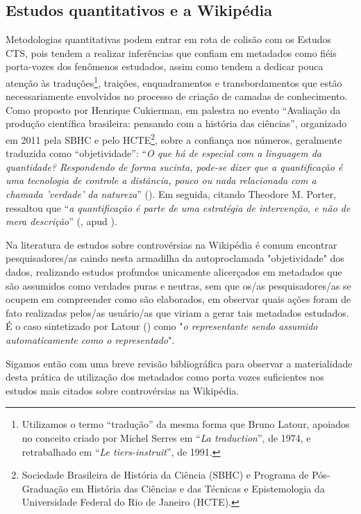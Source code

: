 
\subsection{Estudos quantitativos e a Wikipédia}

Metodologias quantitativas podem entrar em rota de colisão com os Estudos CTS, pois tendem a realizar inferências que confiam em metadados como fiéis porta-vozes dos fenômenos estudados, assim como tendem a dedicar pouca atenção às traduções\footnote{Utilizamos o termo ``tradução'' da mesma forma que  Bruno Latour, apoiados no conceito criado por Michel Serres em ``\textit{La traduction}'', de 1974, e retrabalhado em ``\textit{Le tiers-instruit}'', de 1991.}, traições, enquadramentos e transbordamentos que estão necessariamente envolvidos no processo de criação de camadas de conhecimento. Como proposto por Henrique Cukierman, em palestra no evento ``Avaliação da produção científica brasileira: pensando com a história das ciências'', organizado em 2011 pela SBHC e pelo HCTE\footnote{Sociedade Brasileira de História da Ciência (SBHC) e Programa de Pós-Graduação em História das Ciências e das Técnicas e Epistemologia da Universidade Federal do Rio de Janeiro (HCTE).}, sobre a confiança nos números, geralmente traduzida como ``objetividade'': ``\textit{O que há de especial com a linguagem da quantidade? Respondendo de forma sucinta, pode-se dizer que a quantificação é uma tecnologia de controle a distância, pouco ou nada relacionada com a chamada 'verdade' da natureza}'' (\cite[p.5]{cukierman_uma_2011}). Em seguida, citando Theodore M. Porter, ressaltou que ``\textit{a quantificação é parte de uma estratégia de intervenção, e não de mera descrição}'' (\cite[43]{porter_1996}, apud \cite[p.5]{cukierman_uma_2011}).

Na literatura de estudos sobre controvérsias na Wikipédia é comum encontrar pesquisadores/as caindo nesta armadilha da autoproclamada "objetividade" dos dados, realizando estudos profundos unicamente alicerçados em metadados que são assumidos como verdades puras e neutras, sem que os/as pesquisadores/as se ocupem em compreender como são elaborados, em observar quais ações foram de fato realizadas pelos/as usuário/as que viriam a gerar tais metadados estudados. É o caso sintetizado por Latour (\citeyear{latour_ciencia_1987}) como "\textit{o representante sendo assumido automaticamente como o representado}". 

Sigamos então com uma breve revisão bibliográfica para observar a materialidade desta prática de utilização dos metadados como porta vozes suficientes nos estudos mais citados sobre controvérsias na Wikipédia.

